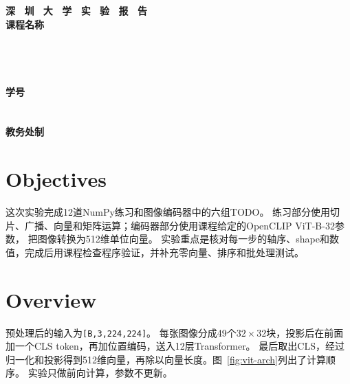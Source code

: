 \documentclass[a4paper,12pt]{article}
\newcommand{\shape}[1]{\texttt{#1}}
\begin{document}
\color{black}

\begin{titlepage}
    \centering
    \vspace*{2cm}
    \Huge{\textbf{深 \ 圳 \ 大 \ 学 \ 实 \ 验  \ 报 \ 告}}\\[1.5cm]
    
    {\Large\textbf{课程名称}\quad\underline{}}\\[0.5cm]
{\Large
\noindent{}
\underline{}}\\[0.5cm]
{\Large
\noindent{}
\underline{}}\\[0.5cm]
{\Large
\noindent{}
\underline{}}\\[0.5cm]
{\Large
\noindent{}
\underline{}}\\[0.5cm]
{\Large
\noindent{}
\underline{}
\hspace{0.5cm}
\textbf{学号}
\underline{}}\\[0.5cm]
{\Large
\noindent{}
\underline{}}\\[0.5cm]
{\Large
\noindent{}
\underline{}}\\[1.5cm]

    \vfill
    \Large{\textbf{教务处制}}
\end{titlepage}

\newpage

\section{Objectives}
这次实验完成12道NumPy练习和图像编码器中的六组TODO。
练习部分使用切片、广播、向量和矩阵运算；编码器部分使用课程给定的OpenCLIP ViT-B-32参数，
把图像转换为512维单位向量。
实验重点是核对每一步的轴序、shape和数值，完成后用课程检查程序验证，并补充零向量、排序和批处理测试。

\section{Overview}
预处理后的输入为\shape{[B,3,224,224]}。
每张图像分成49个$32\times32$块，投影后在前面加一个CLS token，再加位置编码，送入12层Transformer。
最后取出CLS，经过归一化和投影得到512维向量，再除以向量长度。图~\ref{fig:vit-arch}列出了计算顺序。
实验只做前向计算，参数不更新。
\end{document}
